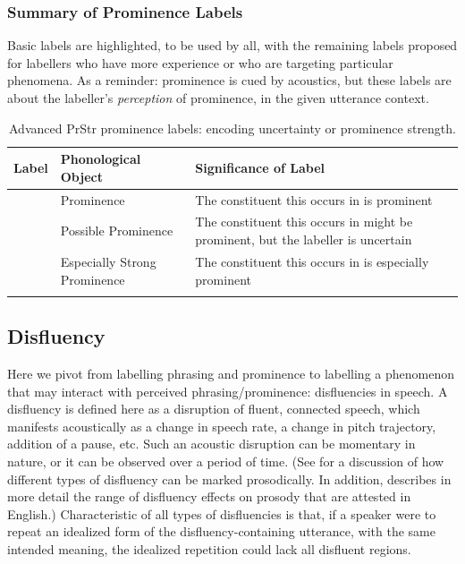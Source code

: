 \documentclass[11pt, twoside]{memoir}
\def\textlabel#1{{\relsize{-.5}\fontspec[Mapping=tex-text]{Roboto Mono}{#1}}}
\begin{document}
\subsubsection{Summary of Prominence Labels}\label{sec:summary-of-prominence-labels}

Basic labels are highlighted, to be used by all, with the remaining labels proposed for labellers who have more experience or who are targeting particular phenomena. As a reminder: prominence is cued by acoustics, but these labels are about the labeller’s \textit{perception} of prominence, in the given utterance context.

\begin{longtable}{clp{.5\linewidth}} \toprule \textbf{Label} & \textbf{Phonological Object} & \textbf{Significance of Label}\tabularnewline
\midrule \endhead
\rowcolor{green}
\textlabel{*} & Prominence & The constituent this occurs in is prominent\tabularnewline
\textlabel{?*} & Possible Prominence & The constituent this occurs in might be prominent, but the labeller is uncertain \tabularnewline
\textlabel{**} & Especially Strong Prominence & The constituent this occurs in is especially prominent \tabularnewline
\bottomrule
\caption{Advanced PrStr prominence labels: encoding uncertainty or prominence strength.}
\end{longtable}

\subsection{Disfluency}\label{sec:disfluency}

Here we pivot from labelling phrasing and prominence to labelling a phenomenon that may interact with perceived phrasing\slash prominence: disfluencies in speech. A disfluency is defined here as a disruption of fluent, connected speech, which manifests acoustically as a change in speech rate, a change in pitch trajectory, addition of a pause, etc. Such an acoustic disruption can be momentary in nature, or it can be observed over a period of time. (See \citealt{shattuck-hufnagelcutler99} for a discussion of how different types of disfluency can be marked prosodically. In addition, \citealt{brugos-19} describes in more detail the range of disfluency effects on prosody that are attested in English.) Characteristic of all types of disfluencies is that, if a speaker were to repeat an idealized form of the disfluency-containing utterance, with the same intended meaning, the idealized repetition could lack all disfluent regions.
\end{document}
